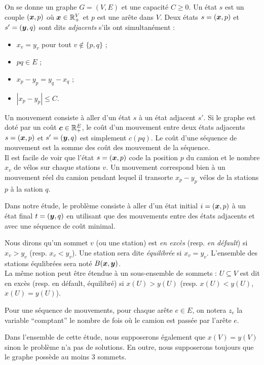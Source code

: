 On se donne un graphe $G=(V,E)$ et une capacité $C \ge 0$. Un état $s$ est un couple $(\boldsymbol{x},p)$ où $\boldsymbol{x} \in \mathbb{R}^V_+$ et $p$ est une arête dans $V$. Deux états $s=(\boldsymbol{x},p)$ et $s'=(\boldsymbol{y},q)$ sont dits \emph{adjacents} s'ils ont simultanément :
\begin{itemize}
\item $x_v=y_v$ pour tout $v \notin \{p,q\}$ ;
\item $pq \in E$ ;
\item $x_p-y_p = y_q-x_q$ ;
\item $\left| x_p-y_p \right| \le C$.
\end{itemize}

Un mouvement consiste à aller d'un état $s$ à un état adjacent $s'$. Si le graphe est doté par un coût $\boldsymbol{c} \in \mathbb{R}^E_+$, le coût d'un mouvement entre deux états adjacents $s=(\boldsymbol{x},p)$ et $s'=(\boldsymbol{y},q)$ est simplement $c(pq)$. Le coût d'une séquence de mouvement est la somme des coût des mouvement de la séquence.
\\

Il est facile de voir que l'état $s=(\boldsymbol{x},p)$ code la position $p$ du camion et le nombre $x_v$ de vélos sur chaque stations $v$. Un mouvement correspond bien à un mouvement réel du camion pendant lequel il transorte $x_p-y_p$ vélos de la stations $p$ à la sation $q$.

Dans notre étude, le problème consiste à aller d'un état initial $i=(\boldsymbol{x},p)$ à un état final $t=(\boldsymbol{y},q)$ en utilisant que des mouvements entre des états adjacents et avec une séquence de coût minimal.

Nous dirons qu'un sommet $v$ (ou une station) est \emph{en excès} (resp. \emph{en défault}) si $x_v > y_v$ (resp. $x_v < y_v$). Une station sera dite \emph{équilibrée} si $x_v=y_v$. L'ensemble des stations équlibrées sera noté $B(\boldsymbol{x},\boldsymbol{y})$.
\\
La même notion peut être étendue à un sous-ensemble de sommets : $U \subseteq V$ est dit en excès (resp. en défault, équilibré) si $x(U) > y(U)$ (resp. $x(U) < y(U)$, $x(U) = y(U)$).

Pour une séquence de mouvements, pour chaque arête $e \in E$, on notera $z_e$ la variable ``comptant'' le nombre de fois où le camion est passée par l'arête $e$.

Dans l'ensemble de cette étude, nous supposerons également que $x(V) = y(V)$ sinon le problème n'a pas de solutions. En outre, nous supposerons toujours que le graphe possède au moins 3 sommets.
\\

